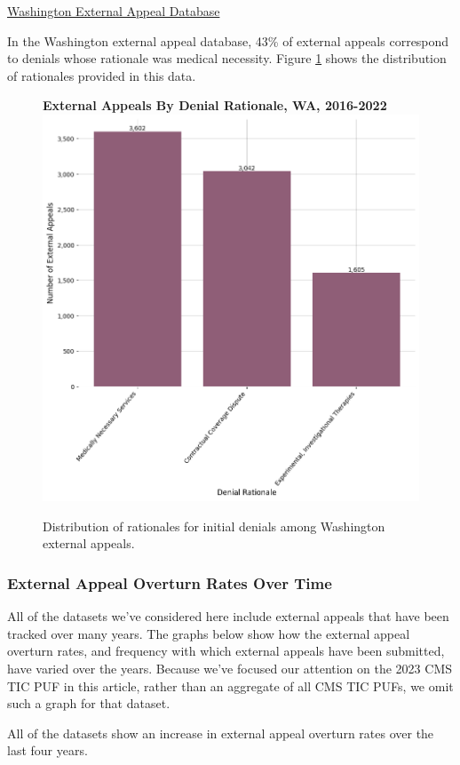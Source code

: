 \documentclass[12pt, a4paper,twoside]{report}
\theoremstyle{plain} %
\theoremstyle{definition} %
\theoremstyle{remark} %
\numberwithin{equation}{chapter}
\begin{document}
	
		\underline{Washington External Appeal Database}

		In the Washington external appeal database, 43\% of external appeals correspond to denials whose rationale was medical necessity. Figure \ref{waexternalappealsbyrationale} shows the distribution of rationales provided in this data.
		
		\begin{figure}[h!]
			\centering
			\textbf{External Appeals By Denial Rationale, WA, 2016-2022}
			\includegraphics[width=.8\textwidth]{images/wa_external_appeals/external_appeals_by_denial_reason.png}
			\caption{Distribution of rationales for initial denials among Washington external appeals.}
			\label{waexternalappealsbyrationale}
		\end{figure}
		
		\subsubsection{External Appeal Overturn Rates Over Time}
		
		All of the datasets we've considered here include external appeals that have been tracked over many years. The graphs below show how the external appeal overturn rates, and frequency with which external appeals have been submitted, have varied over the years. Because we've focused our attention on the 2023 CMS TIC PUF in this article, rather than an aggregate of all CMS TIC PUFs, we omit such a graph for that dataset.
		
		All of the datasets show an increase in external appeal overturn rates over the last four years.
		
\end{document}
